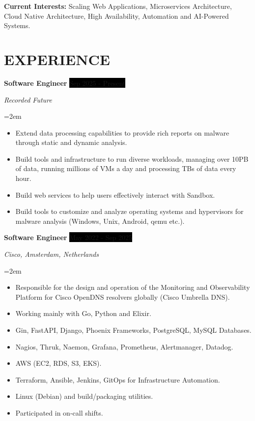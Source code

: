 \documentclass[paper=a4,fontsize=11pt]{scrartcl} %
\newcommand{\sepspace}{\vspace*{1em}}		%
\newcommand{\NewPart}[1]{\section*{\uppercase{#1}}}
\newcommand{\EducationEntry}[4]{
		\noindent \textbf{#1} \hfill      %
		\colorbox{Black}{%
			\parbox{6em}{%
			\hfill\color{White}#2}} \par  %
		\noindent \textit{#3} \par        %
		\noindent\hangindent=2em\hangafter=0 \small #4 %
		\normalsize \par}
\newcommand{\WorkEntry}[4]{				  %
		\noindent \textbf{#1} \hfill      %
		\colorbox{Black}{\color{White}#2} \par  %
		\noindent \textit{#3} \par              %
		\noindent\hangindent=2em\hangafter=0 \small #4 %
		\normalsize \par}
\begin{document}
\sepspace

\textbf{Current Interests:} Scaling Web Applications, Microservices Architecture, Cloud Native Architecture, High Availability, Automation and AI-Powered Systems.

\sepspace


\NewPart{Experience}{}

\WorkEntry{Software Engineer}{Sep 2025 - Present}{Recorded Future}{\begin{itemize}
\item Extend data processing capabilities to provide rich reports on malware through static and dynamic analysis.
\item Build tools and infrastructure to run diverse workloads, managing over 10PB of data, running millions of VMs a day and processing TBs of data every hour.
\item Build web services to help users effectively interact with Sandbox.
\item Build tools to customize and analyze operating systems and hypervisors for malware analysis (Windows, Unix, Android, qemu etc.).
\end{itemize}}
\sepspace

\WorkEntry{Software Engineer}{May 2022 - Sep 2025}{Cisco, Amsterdam, Netherlands}{\begin{itemize}
\item Responsible for the design and operation of the Monitoring and Observability Platform for Cisco OpenDNS resolvers globally (Cisco Umbrella DNS).
\item Working mainly with Go, Python and Elixir.
\item Gin, FastAPI, Django, Phoenix Frameworks, PostgreSQL, MySQL Databases.
\item Nagios, Thruk, Naemon, Grafana, Prometheus, Alertmanager, Datadog.
\item AWS (EC2, RDS, S3, EKS).
\item Terraform, Ansible, Jenkins, GitOps for Infrastructure Automation.
\item Linux (Debian) and build/packaging utilities.
\item Participated in on-call shifts.
\end{itemize}}
\sepspace
\end{document}
